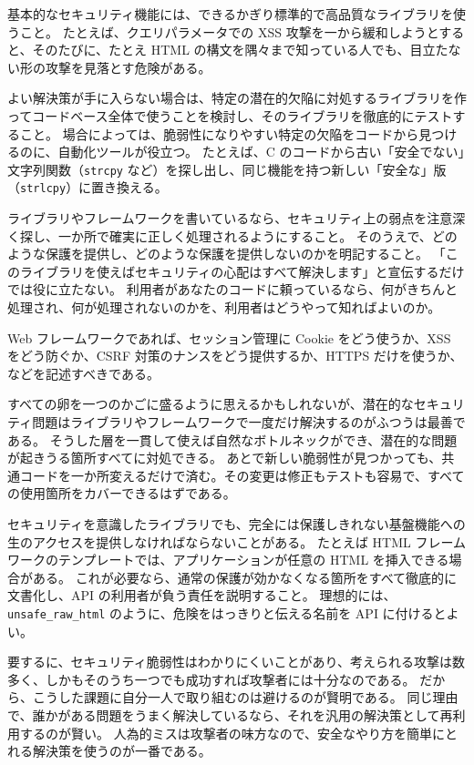 \documentclass[uplatex]{jsarticle}
\def\label#1{}%
\begin{document}
基本的なセキュリティ機能には、できるかぎり標準的で高品質なライブラリを使うこと。
たとえば、クエリパラメータでの XSS 攻撃を一から緩和しようとすると、そのたびに、たとえ HTML の構文を隅々まで知っている人でも、目立たない形の攻撃を見落とす危険がある。

よい解決策が手に入らない場合は、特定の潜在的欠陥に対処するライブラリを作ってコードベース全体で使うことを検討し、そのライブラリを徹底的にテストすること。
場合によっては、脆弱性になりやすい特定の欠陥をコードから見つけるのに、自動化ツールが役立つ。
たとえば、C のコードから古い「安全でない」文字列関数（\texttt{strcpy} など）を探し出し、同じ機能を持つ新しい「安全な」版（\texttt{strlcpy}）に置き換える。

ライブラリやフレームワークを書いているなら、セキュリティ上の弱点を注意深く探し、一か所で確実に正しく処理されるようにすること。
そのうえで、どのような保護を提供し、どのような保護を提供しないのかを明記すること。
「このライブラリを使えばセキュリティの心配はすべて解決します」と宣伝するだけでは役に立たない。
利用者があなたのコードに頼っているなら、何がきちんと処理され、何が処理されないのかを、利用者はどうやって知ればよいのか。

\begin{exa}\label{exa:ch13-web-framework-docs}
Web フレームワークであれば、セッション管理に Cookie をどう使うか、XSS をどう防ぐか、CSRF 対策のナンスをどう提供するか、HTTPS だけを使うか、などを記述すべきである。
\end{exa}

すべての卵を一つのかごに盛るように思えるかもしれないが、潜在的なセキュリティ問題はライブラリやフレームワークで一度だけ解決するのがふつうは最善である。
そうした層を一貫して使えば自然なボトルネックができ、潜在的な問題が起きうる箇所すべてに対処できる。
あとで新しい脆弱性が見つかっても、共通コードを一か所変えるだけで済む。その変更は修正もテストも容易で、すべての使用箇所をカバーできるはずである。

セキュリティを意識したライブラリでも、完全には保護しきれない基盤機能への生のアクセスを提供しなければならないことがある。
たとえば HTML フレームワークのテンプレートでは、アプリケーションが任意の HTML を挿入できる場合がある。
これが必要なら、通常の保護が効かなくなる箇所をすべて徹底的に文書化し、API の利用者が負う責任を説明すること。
理想的には、\texttt{unsafe\_raw\_html} のように、危険をはっきりと伝える名前を API に付けるとよい。

要するに、セキュリティ脆弱性はわかりにくいことがあり、考えられる攻撃は数多く、しかもそのうち一つでも成功すれば攻撃者には十分なのである。
だから、こうした課題に自分一人で取り組むのは避けるのが賢明である。
同じ理由で、誰かがある問題をうまく解決しているなら、それを汎用の解決策として再利用するのが賢い。
人為的ミスは攻撃者の味方なので、安全なやり方を簡単にとれる解決策を使うのが一番である。
\end{document}
